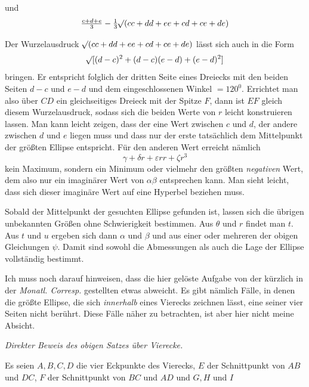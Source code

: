 %
und
\[
\tfrac{c+d+e}{3}-\tfrac13\mathord{{}^{}\!\surd}(cc+dd+ee+cd+ce+de)
\]

Der Wurzelausdruck \(\mathord{{}^{}\!\surd}(cc+dd+ee+cd+ce+de)\) lässt sich auch in die Form
\[
\mathord{{}^{}\!\surd}[(d-c)^2+(d-c)(e-d)+(e-d)^2]
\]
bringen. Er entspricht folglich der dritten Seite eines Dreiecks mit den beiden Seiten \(d-c\) und \(e-d\) und dem eingeschlossenen Winkel \(=120^0\). Errichtet man also über \(CD\) ein gleichseitiges Dreieck mit der Spitze \(F\), dann ist \(EF\) gleich diesem Wurzelausdruck, sodass sich die beiden Werte von \(r\) leicht konstruieren lassen. Man kann leicht zeigen, dass der eine Wert zwischen \(c\) und \(d\), der andere zwischen \(d\) und \(e\) liegen muss und dass nur der erste tatsächlich dem Mittelpunkt der größten Ellipse entspricht. Für den anderen Wert erreicht nämlich
\[
\gamma+\delta r+\varepsilon rr+\zeta r^3
\]
kein Maximum, sondern ein Minimum oder vielmehr den größten \textit{negativen} Wert, dem also nur ein imaginärer Wert von \(\alpha\beta\) entsprechen kann. Man sieht leicht, dass sich dieser imaginäre Wert auf eine Hyperbel beziehen muss.

Sobald der Mittelpunkt der gesuchten Ellipse gefunden ist, lassen sich die übrigen unbekannten Größen ohne Schwierigkeit bestimmen. Aus \(\theta\) und \(r\) findet man \(t\). Aus \(t\) und \(u\) ergeben sich dann \(\alpha\) und \(\beta\) und aus einer oder mehreren der obigen Gleichungen \(\psi\). Damit sind sowohl die Abmessungen als auch die Lage der Ellipse vollständig bestimmt.

Ich muss noch darauf hinweisen, dass die hier gelöste Aufgabe von der kürzlich in der \textit{Monatl. Corresp.} gestellten etwas abweicht. Es gibt nämlich Fälle, in denen die größte Ellipse, die sich \textit{innerhalb} eines Vierecks zeichnen lässt, eine seiner vier Seiten nicht berührt. Diese Fälle näher zu betrachten, ist aber hier nicht meine Absicht.

\par\medskip{}
\begin{center}\textit{Direkter Beweis des obigen Satzes über Vierecke.}\end{center}
\hspace*{\parindent}Es seien \(A,B,C,D\) die vier Eckpunkte des Vierecks, \(E\) der Schnittpunkt von \(AB\) und \(DC\), \(F\) der Schnittpunkt von \(BC\) und \(AD\) und \(G,H\) und \(I\)
